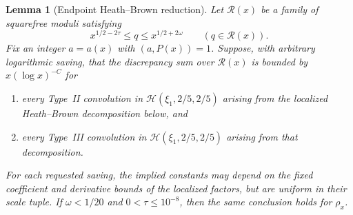 \documentclass[11pt,reqno]{amsart}
\newtheorem{lemma}[theorem]{Lemma}
\theoremstyle{definition}
\theoremstyle{remark}
\numberwithin{equation}{section}
\newcommand{\HH}{\mathcal H}
\begin{document}
\begin{lemma}[Endpoint Heath--Brown reduction]\label{lem:HB-reduction}
Let $\mathcal R(x)$ be a family of squarefree moduli satisfying
\[
 x^{1/2-2\tau}\le q\le x^{1/2+2\omega}\qquad(q\in\mathcal R(x)).
\]
Fix an integer $a=a(x)$ with $(a,P(x))=1$. Suppose, with arbitrary
logarithmic saving, that the discrepancy sum over $\mathcal R(x)$ is
bounded by $x(\log x)^{-C}$ for
\begin{enumerate}
\item every Type~II convolution in $\HH(\xi_1,2/5,2/5)$ arising from
the localized Heath--Brown decomposition below, and
\item every Type~III convolution in $\HH(\xi_1,2/5,2/5)$ arising from
that decomposition.
\end{enumerate}
For each requested saving, the implied constants may depend on the fixed
coefficient and derivative bounds of the localized factors, but are
uniform in their scale tuple.
If $\omega<1/20$ and $0<\tau\le10^{-8}$, then the same conclusion
holds for $\rho_x$.
\end{lemma}
\end{document}
